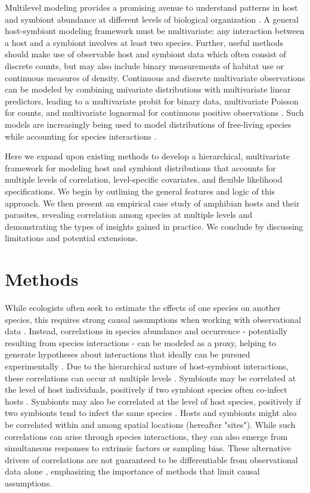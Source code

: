 Multilevel modeling provides a promising avenue to understand patterns in host and symbiont abundance at different levels of biological organization \citep{gelman2007data}.
A general host-symbiont modeling framework must be multivariate: any interaction between a host and a symbiont involves at least two species.
Further, useful methods should make use of observable host and symbiont data which often consist of discrete counts, but may also include binary measurements of habitat use or continuous measures of density.
Continuous and discrete multivariate observations can be modeled by combining univariate distributions with multivariate linear predictors, leading to a multivariate probit for binary data, multivariate Poisson for counts, and multivariate lognormal for continuous positive observations \citep{Ashford1970, Aitchison1982, Aitchison1989}.
Such models are increasingly being used to model distributions of free-living species while accounting for species interactions \citep{Wisz2013, Clark2014, Pollock2014, Warton2015}.

Here we expand upon existing methods to develop a hierarchical, multivariate framework for modeling host and symbiont distributions that accounts for multiple levels of correlation, level-specific covariates, and flexible likelihood specifications.
We begin by outlining the general features and logic of this approach.
We then present an empirical case study of amphibian hosts and their parasites, revealing correlation among species at multiple levels and demonstrating the types of insights gained in practice.
We conclude by discussing limitations and potential extensions.

\section{Methods}

While ecologists often seek to estimate the effects of one species on another species, this requires strong causal assumptions when working with observational data \citep{Pearl2000Causality}.
Instead, correlations in species abundance and occurrence - potentially resulting from species interactions - can be modeled as a proxy, helping to generate hypotheses about interactions that ideally can be pursued experimentally \citep{Ovaskainen2010}.
Due to the hierarchical nature of host-symbiont interactions, these correlations can occur at multiple levels \citep{Mideo2008}.
Symbionts may be correlated at the level of host individuals, positively if two symbiont species often co-infect hosts \citep[e.g.,][]{Puoti2002}.
Symbionts may also be correlated at the level of host species, positively if two symbionts tend to infect the same species \citep[e.g.,][]{Johnson2012}.
Hosts and symbionts might also be correlated within and among spatial locations (hereafter "sites").
While such correlations can arise through species interactions, they can also emerge from simultaneous responses to extrinsic factors or sampling bias.
These alternative drivers of correlations are not guaranteed to be differentiable from observational data alone \citep{Pearl2000Causality, Dorazio2014}, emphasizing the importance of methods that limit causal assumptions.

